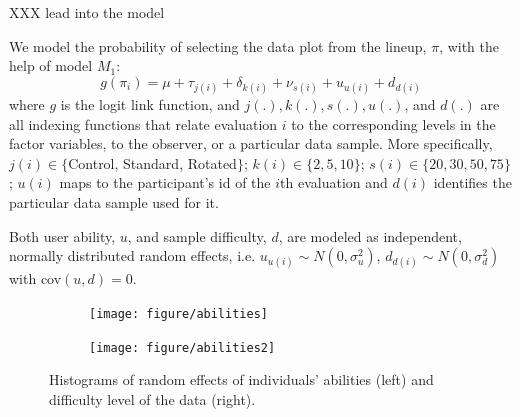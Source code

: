 \documentclass{article}\usepackage[]{graphicx}\usepackage[]{color}
\newenvironment{knitrout}{}{} %
\newcommand{\hh}[1]{{\color{magenta} #1}}
\begin{document}
\hh{XXX lead into the model}

We model the probability of selecting the data plot from the lineup, $\pi$, with the help of model $M_1$:
\[
g(\pi_i) = \mu + \tau_{j(i)} +\delta_{k(i)}+ \nu_{s(i)} + u_{u(i)} + d_{d(i)}
\]
where $g$ is the logit link function, and $j(.), k(.), s(.), u(.)$, and $d(.)$ are all indexing functions that relate evaluation $i$ to the corresponding levels in the factor variables, to the observer, or a particular data sample. More specifically, $j(i) \in \{$Control, Standard, Rotated$\}$; $k(i) \in \{2,5,10\}$; $s(i) \in \{20, 30, 50, 75\}$; $u(i)$ maps to the participant's id of the $i$th evaluation and $d(i)$ identifies the particular data sample used for it. 

Both user ability, $u$, and sample difficulty, $d$, are modeled as independent, normally distributed  random effects, i.e. $u_{u(i)} \sim N(0, \sigma_u^2)$, $d_{d(i)} \sim N(0,\sigma_d^2)$ with cov$(u, d) = 0$.





\begin{figure}
\begin{subfigure}[b]{0.5\textwidth}
\begin{knitrout}
\color{fgcolor}
\texttt{[image: figure/abilities]} 

\end{knitrout}

\end{subfigure}
\begin{subfigure}[b]{0.5\textwidth}
\begin{knitrout}
\color{fgcolor}
\texttt{[image: figure/abilities2]} 

\end{knitrout}

\end{subfigure}
\caption{\label{fig:ranef}Histograms of random effects of individuals' abilities (left) and difficulty level of the data (right). }
\end{figure}
\end{document}
